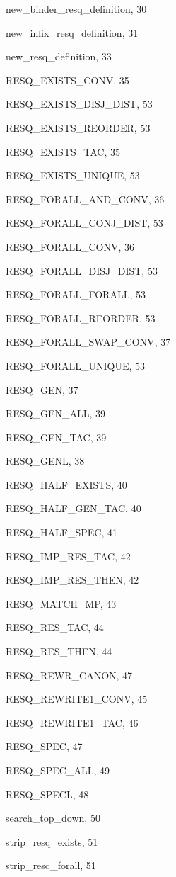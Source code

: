 \begin{theindex}
  \indexspace

  \item {\ptt new\_binder\_resq\_definition}, 30
  \item {\ptt new\_infix\_resq\_definition}, 31
  \item {\ptt new\_resq\_definition}, 33

  \indexspace

  \item {\ptt RESQ\_EXISTS\_CONV}, 35
  \item {\ptt RESQ\_EXISTS\_DISJ\_DIST}, 53
  \item {\ptt RESQ\_EXISTS\_REORDER}, 53
  \item {\ptt RESQ\_EXISTS\_TAC}, 35
  \item {\ptt RESQ\_EXISTS\_UNIQUE}, 53
  \item {\ptt RESQ\_FORALL\_AND\_CONV}, 36
  \item {\ptt RESQ\_FORALL\_CONJ\_DIST}, 53
  \item {\ptt RESQ\_FORALL\_CONV}, 36
  \item {\ptt RESQ\_FORALL\_DISJ\_DIST}, 53
  \item {\ptt RESQ\_FORALL\_FORALL}, 53
  \item {\ptt RESQ\_FORALL\_REORDER}, 53
  \item {\ptt RESQ\_FORALL\_SWAP\_CONV}, 37
  \item {\ptt RESQ\_FORALL\_UNIQUE}, 53
  \item {\ptt RESQ\_GEN}, 37
  \item {\ptt RESQ\_GEN\_ALL}, 39
  \item {\ptt RESQ\_GEN\_TAC}, 39
  \item {\ptt RESQ\_GENL}, 38
  \item {\ptt RESQ\_HALF\_EXISTS}, 40
  \item {\ptt RESQ\_HALF\_GEN\_TAC}, 40
  \item {\ptt RESQ\_HALF\_SPEC}, 41
  \item {\ptt RESQ\_IMP\_RES\_TAC}, 42
  \item {\ptt RESQ\_IMP\_RES\_THEN}, 42
  \item {\ptt RESQ\_MATCH\_MP}, 43
  \item {\ptt RESQ\_RES\_TAC}, 44
  \item {\ptt RESQ\_RES\_THEN}, 44
  \item {\ptt RESQ\_REWR\_CANON}, 47
  \item {\ptt RESQ\_REWRITE1\_CONV}, 45
  \item {\ptt RESQ\_REWRITE1\_TAC}, 46
  \item {\ptt RESQ\_SPEC}, 47
  \item {\ptt RESQ\_SPEC\_ALL}, 49
  \item {\ptt RESQ\_SPECL}, 48

  \indexspace

  \item {\ptt search\_top\_down}, 50
  \item {\ptt strip\_resq\_exists}, 51
  \item {\ptt strip\_resq\_forall}, 51

\end{theindex}
